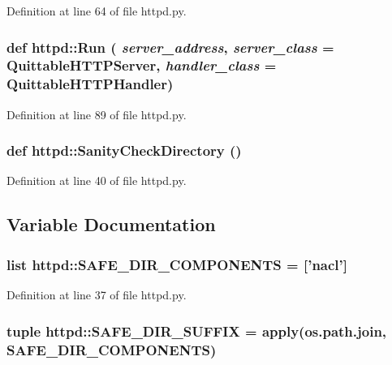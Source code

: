 Definition at line 64 of file httpd.py.

\hypertarget{namespacehttpd_abbb72598ee3e6bc16815e9545faadb4b}{
\subsubsection[{Run}]{\setlength{\rightskip}{0pt plus 5cm}def httpd::Run ( {\em server\_\-address}, \/   {\em server\_\-class} = {\ttfamily QuittableHTTPServer}, \/   {\em handler\_\-class} = {\ttfamily QuittableHTTPHandler})}}
\label{namespacehttpd_abbb72598ee3e6bc16815e9545faadb4b}


Definition at line 89 of file httpd.py.

\hypertarget{namespacehttpd_a6da503c6b97f5225addf690d831ef5e0}{
\subsubsection[{SanityCheckDirectory}]{\setlength{\rightskip}{0pt plus 5cm}def httpd::SanityCheckDirectory ()}}
\label{namespacehttpd_a6da503c6b97f5225addf690d831ef5e0}


Definition at line 40 of file httpd.py.



\subsection{Variable Documentation}
\hypertarget{namespacehttpd_a20bf8bb90b3f20597551ccd964a4807d}{
\subsubsection[{SAFE\_\-DIR\_\-COMPONENTS}]{\setlength{\rightskip}{0pt plus 5cm}list {\bf httpd::SAFE\_\-DIR\_\-COMPONENTS} = \mbox{[}'nacl'\mbox{]}}}
\label{namespacehttpd_a20bf8bb90b3f20597551ccd964a4807d}


Definition at line 37 of file httpd.py.

\hypertarget{namespacehttpd_aa9c232e22e2a0f42b96ad04b3b3a9e84}{
\subsubsection[{SAFE\_\-DIR\_\-SUFFIX}]{\setlength{\rightskip}{0pt plus 5cm}tuple {\bf httpd::SAFE\_\-DIR\_\-SUFFIX} = apply(os.path.join, {\bf SAFE\_\-DIR\_\-COMPONENTS})}}
\label{namespacehttpd_aa9c232e22e2a0f42b96ad04b3b3a9e84}


